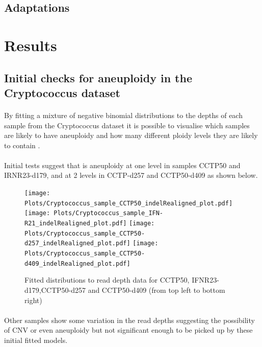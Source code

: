\documentclass[11pt]{article}
\begin{document}
\subsection{Adaptations}

\paragraph{} 

\section{Results}
\subsection{Initial checks for aneuploidy in the Cryptococcus dataset}
\paragraph{}By fitting a mixture of negative binomial distributions to the depths of each sample from the Cryptococcus dataset it is possible to visualise which samples are likely to have aneuploidy and how many different ploidy levels they are likely to contain \autocite{Tarrant2018}. 
\paragraph{}Initial tests suggest that is aneuploidy at one level in samples CCTP50 and IRNR23-d179, and at 2 levels in CCTP-d257 and CCTP50-d409 as shown below.
\begin{figure}[H]
\label{fig:fits}
\begin{center}
\caption{Fitted distributions to read depth data for CCTP50, IFNR23-d179,CCTP50-d257 and CCTP50-d409 (from top left to bottom right)}
\texttt{[image: Plots/Cryptococcus\_sample\_CCTP50\_indelRealigned\_plot.pdf]}
\texttt{[image: Plots/Cryptococcus\_sample\_IFN-R21\_indelRealigned\_plot.pdf]}
\texttt{[image: Plots/Cryptococcus\_sample\_CCTP50-d257\_indelRealigned\_plot.pdf]}
\texttt{[image: Plots/Cryptococcus\_sample\_CCTP50-d409\_indelRealigned\_plot.pdf]}
\end{center}
\end{figure}

\paragraph{}Other samples show some variation in the read depths suggesting the possibility of CNV or even aneuploidy but not significant enough to be picked up by these initial fitted models. 
\end{document}
